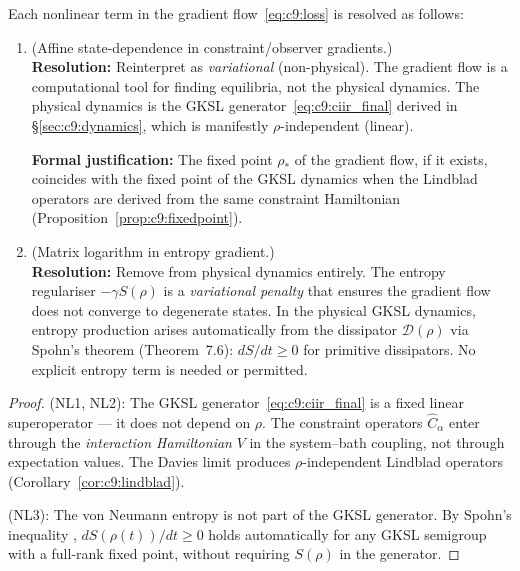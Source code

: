\begin{theorem}
\label{thm:c9:nonlinear_fix}
Each nonlinear term in the gradient flow~\eqref{eq:c9:loss} is resolved
as follows:
\begin{enumerate}
\item[\textbf{NL1, NL2}] (Affine state-dependence in constraint/observer
  gradients.)\\
  \textbf{Resolution:}  Reinterpret as \emph{variational} (non-physical).
  The gradient flow is a computational tool for finding equilibria, not
  the physical dynamics.  The physical dynamics is the GKSL
  generator~\eqref{eq:c9:ciir_final} derived in \S\ref{sec:c9:dynamics},
  which is manifestly $\rho$-independent (linear).

  \textbf{Formal justification:}  The fixed point $\rho_*$ of the
  gradient flow, if it exists, coincides with the fixed point of the
  GKSL dynamics when the Lindblad operators are derived from the same
  constraint Hamiltonian (Proposition~\ref{prop:c9:fixedpoint}).

\item[\textbf{NL3}] (Matrix logarithm in entropy gradient.)\\
  \textbf{Resolution:}  Remove from physical dynamics entirely.
  The entropy regulariser $-\gamma S(\rho)$ is a \emph{variational
  penalty} that ensures the gradient flow does not converge to
  degenerate states.  In the physical GKSL dynamics, entropy production
  arises automatically from the dissipator $\mathcal{D}(\rho)$ via
  Spohn's theorem (Theorem~7.6): $dS/dt \geq 0$ for primitive
  dissipators.  No explicit entropy term is needed or permitted.
\end{enumerate}
\end{theorem}

\begin{proof}
(NL1, NL2):  The GKSL generator~\eqref{eq:c9:ciir_final} is a fixed
linear superoperator — it does not depend on $\rho$.  The constraint
operators $\hat{C}_\alpha$ enter through the \emph{interaction
Hamiltonian} $V$ in the system--bath coupling, not through expectation
values.  The Davies limit produces $\rho$-independent Lindblad
operators (Corollary~\ref{cor:c9:lindblad}).

(NL3):  The von Neumann entropy is not part of the GKSL generator.
By Spohn's inequality \cite{Spohn1978},
$dS(\rho(t))/dt \geq 0$ holds automatically for any GKSL semigroup
with a full-rank fixed point, without requiring $S(\rho)$ in the
generator.
\end{proof}

